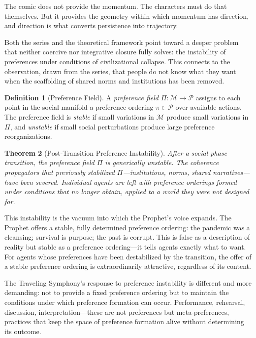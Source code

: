 \documentclass[12pt, oneside]{article}
\theoremstyle{plain}
\newtheorem{theorem}{Theorem}[section]
\theoremstyle{definition}
\newtheorem{definition}[theorem]{Definition}
\theoremstyle{remark}
\begin{document}
The comic does not provide the momentum. The characters must do
that themselves. But it provides the geometry within which momentum
has direction, and direction is what converts persistence into
trajectory.

Both the series and the theoretical framework point toward a deeper
problem that neither coercive nor integrative closure fully solves:
the instability of preferences under conditions of civilizational
collapse. This connects to the observation, drawn from the series,
that people do not know what they want when the scaffolding of
shared norms and institutions has been removed.

\begin{definition}[Preference Field]
A \emph{preference field} $\Pi : \mathcal{M} \to \mathcal{P}$
assigns to each point in the social manifold a preference ordering
$\pi \in \mathcal{P}$ over available actions. The preference field
is \emph{stable} if small variations in $\mathcal{M}$ produce small
variations in $\Pi$, and \emph{unstable} if small social
perturbations produce large preference reorganizations.
\end{definition}

\begin{theorem}[Post-Transition Preference Instability]
After a social phase transition, the preference field $\Pi$ is
generically unstable. The coherence propagators that previously
stabilized $\Pi$---institutions, norms, shared narratives---have
been severed. Individual agents are left with preference orderings
formed under conditions that no longer obtain, applied to a world
they were not designed for.
\end{theorem}

This instability is the vacuum into which the Prophet's voice
expands. The Prophet offers a stable, fully determined preference
ordering: the pandemic was a cleansing; survival is purpose; the
past is corrupt. This is false as a description of reality but
stable as a preference ordering---it tells agents exactly what to
want. For agents whose preferences have been destabilized by the
transition, the offer of a stable preference ordering is
extraordinarily attractive, regardless of its content.

The Traveling Symphony's response to preference instability is
different and more demanding: not to provide a fixed preference
ordering but to maintain the conditions under which preference
formation can occur. Performance, rehearsal, discussion,
interpretation---these are not preferences but meta-preferences,
practices that keep the space of preference formation alive without
determining its outcome.
\end{document}
